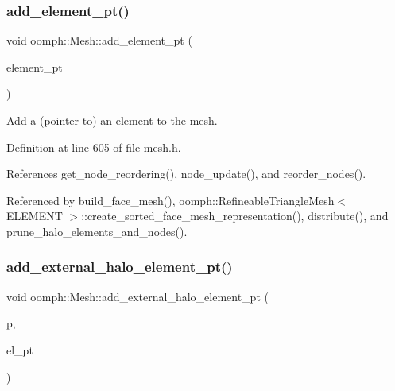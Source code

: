 \mbox{\label{classoomph_1_1Mesh_aafc35b5df26c448b5d5ab26a793eee35}} 
\subsubsection{\texorpdfstring{add\+\_\+element\+\_\+pt()}{add\_element\_pt()}}
{\footnotesize\ttfamily void oomph\+::\+Mesh\+::add\+\_\+element\+\_\+pt (\begin{DoxyParamCaption}\item[{\hyperlink{classoomph_1_1GeneralisedElement}{Generalised\+Element} $\ast$const \&}]{element\+\_\+pt }\end{DoxyParamCaption})\hspace{0.3cm}{\ttfamily [inline]}}



Add a (pointer to) an element to the mesh. 



Definition at line 605 of file mesh.\+h.



References get\+\_\+node\+\_\+reordering(), node\+\_\+update(), and reorder\+\_\+nodes().



Referenced by build\+\_\+face\+\_\+mesh(), oomph\+::\+Refineable\+Triangle\+Mesh$<$ E\+L\+E\+M\+E\+N\+T $>$\+::create\+\_\+sorted\+\_\+face\+\_\+mesh\+\_\+representation(), distribute(), and prune\+\_\+halo\+\_\+elements\+\_\+and\+\_\+nodes().

\mbox{\label{classoomph_1_1Mesh_a35c971cb52e791d82377b6ce299dbaec}} 
\subsubsection{\texorpdfstring{add\+\_\+external\+\_\+halo\+\_\+element\+\_\+pt()}{add\_external\_halo\_element\_pt()}}
{\footnotesize\ttfamily void oomph\+::\+Mesh\+::add\+\_\+external\+\_\+halo\+\_\+element\+\_\+pt (\begin{DoxyParamCaption}\item[{const unsigned \&}]{p,  }\item[{\hyperlink{classoomph_1_1GeneralisedElement}{Generalised\+Element} $\ast$\&}]{el\+\_\+pt }\end{DoxyParamCaption})\hspace{0.3cm}{\ttfamily [inline]}}



